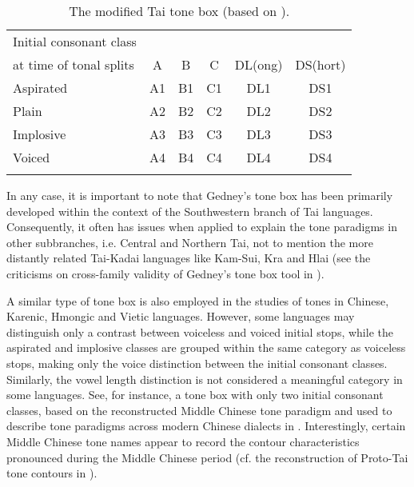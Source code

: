 \documentclass[output=paper]{langscibook}
\begin{document}
\begin{table}
\begin{tabular}{l *5{c} }
\lsptoprule
Initial consonant class & \\
at time of tonal splits & A & B & C & DL(ong) & DS(hort)\\\midrule
Aspirated & A1 & B1 & C1 & DL1 & DS1\\
Plain & A2 & B2 & C2 & DL2 & DS2\\
Implosive & A3 & B3 & C3 & DL3 & DS3\\
Voiced & A4 & B4 & C4 & DL4 & DS4\\
\lspbottomrule
\end{tabular}
\caption{The modified Tai tone box (based on \citealt{Gedney1972}).}
\label{tab:yurayong:2}
\end{table}

In any case, it is important to note that Gedney’s tone box has been primarily developed within the context of the Southwestern branch of Tai languages. Consequently, it often has issues when applied to explain the tone paradigms in other subbranches, i.e. Central and Northern Tai, not to mention the more distantly related Tai-Kadai languages like Kam-Sui, Kra and Hlai (see the criticisms on cross-family validity of Gedney’s tone box tool in \citealt{Liao2023a}).

A similar type of tone box is also employed in the studies of tones in Chinese, Karenic, Hmongic and Vietic languages. However, some languages may distinguish only a contrast between voiceless and voiced initial stops, while the aspirated and implosive classes are grouped within the same category as voiceless stops, making only the voice distinction between the initial consonant classes. Similarly, the vowel length distinction is not considered a meaningful category in some languages. See, for instance, a tone box with only two initial consonant classes, based on the reconstructed Middle Chinese tone paradigm and used to describe tone paradigms across modern Chinese dialects in . Interestingly, certain Middle Chinese tone names appear to record the contour characteristics pronounced during the Middle Chinese period (cf. the reconstruction of Proto-Tai tone contours in \citealt[271]{Pittayaporn2009}).
\end{document}
